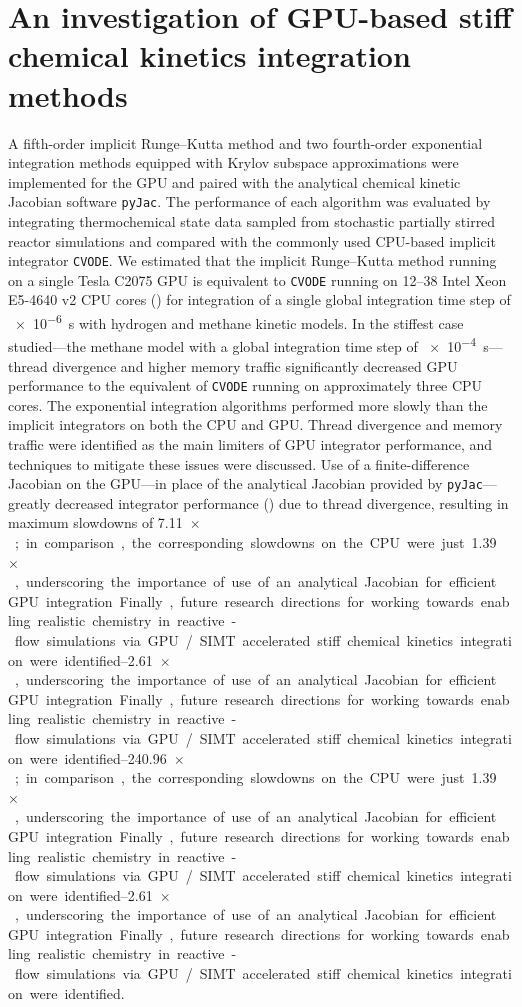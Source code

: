 \documentclass[a4paper,10pt]{article}
\begin{document}
\section{An investigation of GPU-based stiff chemical kinetics integration methods}
A fifth-order implicit Runge--Kutta method and two fourth-order exponential integration methods equipped with Krylov subspace approximations were implemented for the GPU and paired with the analytical chemical kinetic Jacobian software \texttt{pyJac}.
The performance of each algorithm was evaluated by integrating thermochemical state data sampled from stochastic partially stirred reactor simulations and compared with the commonly used CPU-based implicit integrator \texttt{CVODE}.
We estimated that the implicit Runge--Kutta method running on a single Tesla C2075 GPU is equivalent to \texttt{CVODE} running on \numrange{12}{38} Intel Xeon E5-4640 v2 CPU cores () for integration of a single global integration time step of \SI{e-6}{\second} with hydrogen and methane kinetic models.
In the stiffest case studied---the methane model with a global integration time step of \SI{e-4}{\second}---thread divergence and higher memory traffic significantly decreased GPU performance to the equivalent of \texttt{CVODE} running on approximately three CPU cores.
The exponential integration algorithms performed more slowly than the implicit integrators on both the CPU and GPU.
Thread divergence and memory traffic were identified as the main limiters of GPU integrator performance, and techniques to mitigate these issues were discussed.
Use of a finite-difference Jacobian on the GPU---in place of the analytical Jacobian provided by \texttt{pyJac}---greatly decreased integrator performance () due to thread divergence, resulting in maximum slowdowns of \SIrange{7.11}{240.96}{$\times$}; in comparison, the corresponding slowdowns on the CPU were just \SIrange{1.39}{2.61}{$\times$}, underscoring the importance of use of an analytical Jacobian for efficient GPU integration.
Finally, future research directions for working towards enabling realistic chemistry in reactive-flow simulations via GPU\slash SIMT accelerated stiff chemical kinetics integration were identified.
\end{document}
